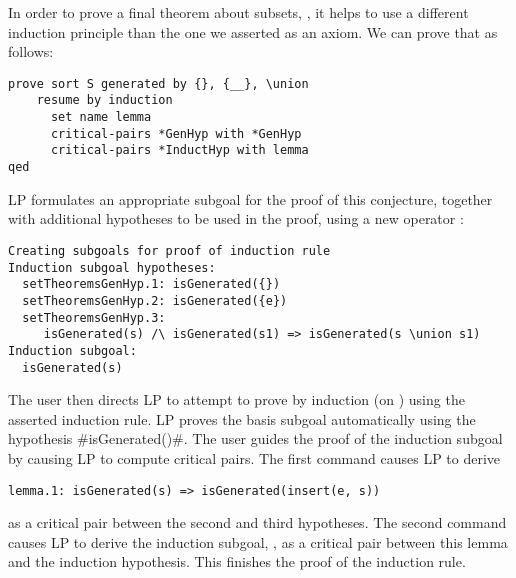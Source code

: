 
In order to prove a final theorem about subsets, , it helps
to use a different induction principle than the one we asserted as an axiom.
We can prove that  as follows:
\begin{verbatim}
prove sort S generated by {}, {__}, \union
    resume by induction
      set name lemma
      critical-pairs *GenHyp with *GenHyp
      critical-pairs *InductHyp with lemma
qed
\end{verbatim}
LP formulates an appropriate subgoal for the proof of this conjecture, together
with additional hypotheses to be used in the proof, using a new operator
:
\begin{verbatim}
Creating subgoals for proof of induction rule
Induction subgoal hypotheses:
  setTheoremsGenHyp.1: isGenerated({})
  setTheoremsGenHyp.2: isGenerated({e})
  setTheoremsGenHyp.3:
     isGenerated(s) /\ isGenerated(s1) => isGenerated(s \union s1)
Induction subgoal:
  isGenerated(s)
\end{verbatim}
The user then directs LP to attempt to prove  by induction
(on ) using the asserted induction rule.  LP proves the basis subgoal 
automatically using the hypothesis \fq#isGenerated({})#.  The user guides the
proof of the induction subgoal by causing LP to compute critical pairs.  The
first  command causes LP to derive
\begin{verbatim}
lemma.1: isGenerated(s) => isGenerated(insert(e, s))
\end{verbatim}
as a critical pair between the second and third  hypotheses.
The second  command causes LP to derive the induction
subgoal, , as a critical pair between this lemma
and the induction hypothesis.  This finishes the proof of the induction rule.

